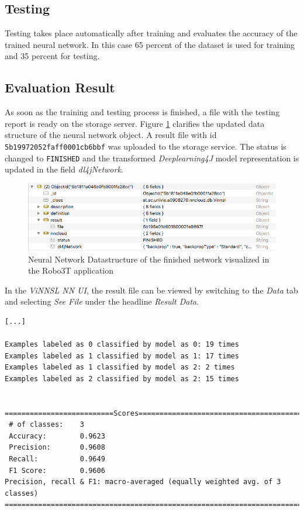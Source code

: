 \cite{dl4j-traininui}

\subsection{Testing}\label{testing}

Testing takes place automatically after training and evaluates the
accuracy of the trained neural network. In this case 65 percent of the
dataset is used for training and 35 percent for testing.

\subsection{Evaluation Result}\label{evaluation-result}

As soon as the training and testing process is finished, a file with the
testing report is ready on the storage server. Figure
\ref{usecase_1_datastructure_finished} clarifies the updated data
structure of the neural network object. A result file with id
\texttt{5b19972052faff0001cb6bbf} was uploaded to the storage service.
The status is changed to \texttt{FINISHED} and the transformed
\emph{Deeplearning4J} model representation is updated in the field
\emph{dl4jNetwork}.

\begin{figure}
\centering
\includegraphics[width=12.00000cm]{images/usecase_1_datastructure_finished}
\caption[Neural Network Datastructure of the finished network visualized
in the Robo3T application
\label{usecase_1_datastructure_finished}]{Neural Network Datastructure
of the finished network visualized in the Robo3T\footnotemark{}
application \label{usecase_1_datastructure_finished}}
\end{figure}

In the \emph{ViNNSL NN UI}, the result file can be viewed by switching
to the \emph{Data} tab and selecting \emph{See File} under the headline
\emph{Result Data}.

\begin{verbatim}
[...]

Examples labeled as 0 classified by model as 0: 19 times
Examples labeled as 1 classified by model as 1: 17 times
Examples labeled as 1 classified by model as 2: 2 times
Examples labeled as 2 classified by model as 2: 15 times


==========================Scores===========================================
 # of classes:    3
 Accuracy:        0.9623
 Precision:       0.9608
 Recall:          0.9649
 F1 Score:        0.9606
Precision, recall & F1: macro-averaged (equally weighted avg. of 3 classes)
===========================================================================
\end{verbatim}

